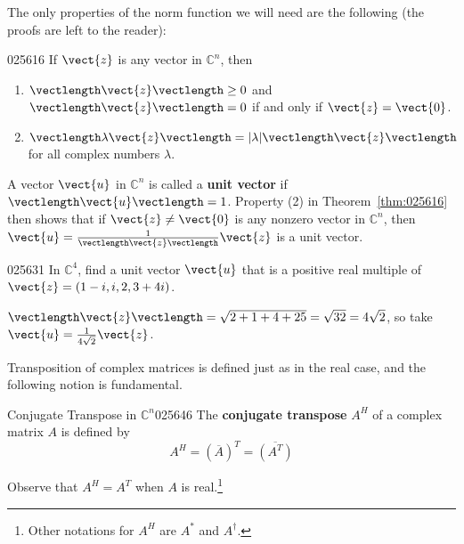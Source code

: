 \noindent The only properties of the norm function we will need are the following (the proofs are left to the reader):


\begin{theorem}{}{025616}
If $\vect{z}$ is any vector in $\mathbb{C}^n$, then


\begin{enumerate}
\item $\vectlength \vect{z} \vectlength \geq 0$ and $\vectlength \vect{z} \vectlength = 0$ if and only if $\vect{z} = \vect{0}$.

\item $\vectlength \lambda\vect{z} \vectlength = |\lambda| \vectlength \vect{z} \vectlength$ for all complex numbers $\lambda$.

\end{enumerate}
\end{theorem}

A vector $\vect{u}$ in $\mathbb{C}^n$ is called a \textbf{unit vector} if $\vectlength\vect{u}\vectlength = 1$. Property (2) in Theorem~\ref{thm:025616} then shows that if $\vect{z} \neq \vect{0}$ is any nonzero vector in $\mathbb{C}^n$, then $\vect{u} = \frac{1}{\vectlength \vect{z} \vectlength}\vect{z}$ is a unit vector.


\begin{example}{}{025631}
In $\mathbb{C}^4$, find a unit vector $\vect{u}$ that is a positive real multiple of $\vect{z} = (1 - i, i, 2, 3 + 4i)$.


\begin{solution}
$\vectlength \vect{z} \vectlength = \sqrt{2+1+4+25} = \sqrt{32} = 4\sqrt{2}$, so take $\vect{u} = \frac{1}{4\sqrt{2}}\vect{z}$.
\end{solution}
\end{example}

Transposition of complex matrices is defined just as in the real case, and the following notion is fundamental.


\begin{definition}{Conjugate Transpose in $\mathbb{C}^n$}{025646}
The \textbf{conjugate transpose} $A^{H}$ of a complex matrix $A$ is defined by
\begin{equation*}
A^H = (\overline{A})^T = \overline{(A^T)}
\end{equation*}
\end{definition}

\noindent Observe that $A^{H} = A^{T}$ when $A$ is real.\footnote{Other notations for $A^{H}$ are $A^\ast$ and $A^\dagger$.}

